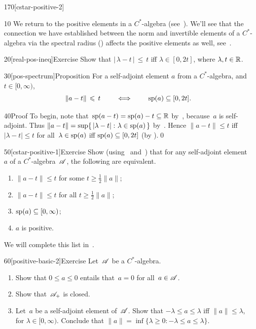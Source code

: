 \begin{parsec}{170}[cstar-positive-2]%
\begin{point}{10}%
We return to the positive elements 
in a $C^*$-algebra (see~).
We'll see that the connection we have established
between the norm and invertible elements
of a $C^*$-algebra
via the spectral radius ()
affects the positive elements as well, see~.
\end{point}
\begin{point}{20}[real-pos-ineq]{Exercise}%
Show that 
$\left|\,\lambda-t\,\right| \,\leq\, t$ iff  $\lambda \in[0,2t]$,
where $\lambda,t\in\mathbb{R}$.
\end{point}
\begin{point}{30}[pos-spectrum]{Proposition}%
For a self-adjoint element $a$ from a $C^*$-algebra,
and $t\in [0,\infty)$,
\begin{equation*}
\|a-t\|\,\leqslant\, t\qquad\iff\qquad \mathrm{sp}(a)\subseteq [0,2t].
\end{equation*}%
\spacingfix{}%
\begin{point}{40}{Proof}%
To begin, note that~$\mathrm{sp}(a-t)=\mathrm{sp}(a)-t\subseteq \mathbb{R}$ 
by~,
because~$a$ is self-adjoint.
Thus $\|a-t\|=\sup\{\,\left|\lambda-t\right|\colon \lambda\in \mathrm{sp}(a)\,\}$
by~.
Hence $\|a-t\|\leq t$
iff $\left|\lambda-t\right|\leq t$ for all~$\lambda\in\mathrm{sp}(a)$
iff $\mathrm{sp}(a)\subseteq [0,2t]$ (by ).\qed
\end{point}
\end{point}
\begin{point}{50}[cstar-positive-1]{Exercise}%
%
Show
(using~ and~)
that
for any self-adjoint element $a$ of a $C^*$-algebra~$\mathscr{A}$,
the following are equivalent.
\begin{enumerate}
\item 
\label{cstar-pos-1}
$\|a-t\|\leq t$
for some $t\geq \frac{1}{2}\|a\|$;
\item 
\label{cstar-pos-2}
$\|a-t\|\leq t$
for all $t\geq \frac{1}{2}\|a\|$;
\item 
\label{cstar-pos-3}
$\mathrm{sp}(a)\subseteq[0,\infty)$;
\item
$a$ is positive.
\end{enumerate}
We will complete this list in~.
\end{point}
\begin{point}{60}[positive-basic-2]{Exercise}%
Let~$\mathscr{A}$ be a $C^*$-algebra.
\begin{enumerate}
\item
Show that $0\leq a\leq 0$ entails that~$a=0$
for all~$a\in\mathscr{A}$.
\item
Show that~$\mathscr{A}_{+}$ is closed.
\item
Let~$a$ be a self-adjoint element of~$\mathscr{A}$.
Show that
 $-\lambda \leq a\leq \lambda$
iff $\|a\|\leq \lambda$,
for $\lambda\in [0,\infty)$.
Conclude that $\|a\| = \inf\{ \lambda \geq 0\colon
-\lambda \leq a\leq \lambda\}$.


\end{enumerate}
\end{point}
\end{parsec}
